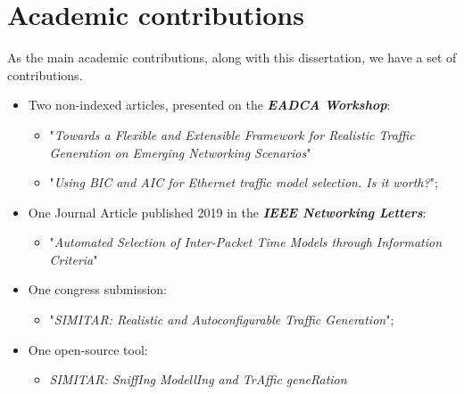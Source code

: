 \chapter{Academic contributions}
\label{ap:publications}

As the main academic contributions, along with this dissertation, we have a set of contributions. 
\begin{itemize}
    \item Two non-indexed articles, presented on the \textit{\textbf{EADCA Workshop}}:
        \begin{itemize}
        \item "\textit{Towards a Flexible and Extensible Framework for Realistic Traffic
        Generation on Emerging Networking Scenarios}"\cite{eadca-demo}
        \item "\textit{Using BIC and AIC for Ethernet traffic model selection. Is it worth?}"\cite{eadca-aic-bic};
        \end{itemize}
    
    \item One Journal Article published 2019 in the \textit{\textbf{IEEE Networking Letters}}:
        \begin{itemize}
        \item "\textit{Automated Selection of Inter-Packet Time Models through Information Criteria}"\cite{aic-bic-paper}
        \end{itemize}
    \item One congress submission:
        \begin{itemize}
        \item  "\textit{SIMITAR: Realistic and Autoconfigurable Traffic Generation}";
        \end{itemize}
    \item One open-source tool: 
        \begin{itemize}
        \item \textit{SIMITAR: SniffIng ModellIng and TrAffic geneRation}\cite{projeto-github}
        \end{itemize}
\end{itemize}










%


